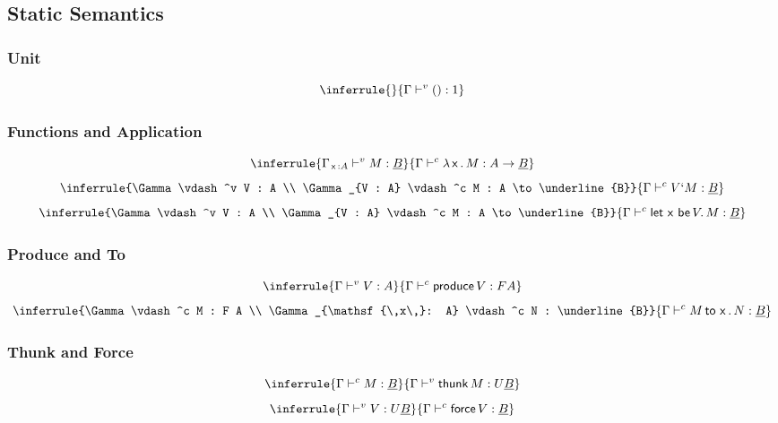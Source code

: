 \documentclass{article}
\newcommand{\x}{\mathsf{\,x\,}}
\newcommand{\letc}{\mathsf{let \,}}
\newcommand{\toc}{\mathsf{\, to \,}}
\newcommand{\1}{\mathsf{\,\#1\,}}
\newcommand{\2}{\mathsf{\,\#2\,}}
\newcommand{\force}{\mathsf{force \,}}
\newcommand{\be}{\mathsf{\, be \,}}
\newcommand{\thunk}{\mathsf{thunk \,}}
\newcommand{\produce}{\mathsf{produce \,}}
\newcommand{\B}{\underline{B}}
\begin{document}
\subsection{Static Semantics}
\begin{multicols}{2}
	\subsubsection*{Unit}
	\begin{equation*}
		\inferrule{ }{\Gamma \vdash^v () : 1}
	\end{equation*}

	\subsubsection*{Functions and Application}
	\begin{equation*}
		\inferrule{\Gamma_{\x : A} \vdash^v M : \B}{\Gamma \vdash^c \lambda \x.\, M : A \to \B} 
	\end{equation*}
	\begin{equation*}
		\inferrule{\Gamma \vdash^v V : A \\ \Gamma_{V : A} \vdash^c M : A \to \B}
		{\Gamma \vdash^c V` M : \B} 
	\end{equation*}
	\begin{equation*}
		\inferrule{\Gamma \vdash^v V : A \\ \Gamma_{V : A} \vdash^c M : A \to \B}
		{\Gamma \vdash^c \letc \x \be V.\, M : \B} 
	\end{equation*}
	
	\subsubsection*{Produce and To}
	\begin{equation*}
		\inferrule{\Gamma \vdash^v V : A}{\Gamma \vdash^c \produce V : F A} 
	\end{equation*}
	\begin{equation*}
		\inferrule{\Gamma \vdash^c M : F A \\ \Gamma_{\x : A} \vdash^c N : \B}
		{\Gamma \vdash^c M \toc \x.\, N : \B} 
	\end{equation*}
	
	\subsubsection*{Thunk and Force}
	\begin{equation*}
		\inferrule{\Gamma \vdash^c M : \B}{\Gamma \vdash^v \thunk M : U \B} 
	\end{equation*}
	\begin{equation*}
		\inferrule{\Gamma \vdash^v V : U \B}{\Gamma \vdash^c \force V : \B} 
	\end{equation*}


\end{multicols}
\end{document}
